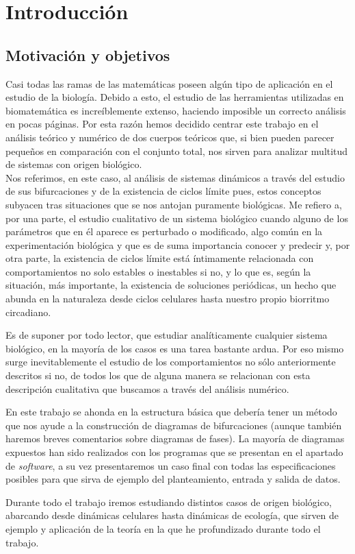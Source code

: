 \chapter{Introducción}

\section{ Motivación y objetivos}
Casi todas las ramas de las matemáticas poseen algún tipo de aplicación en el estudio de la biología. Debido a esto, el estudio de las herramientas utilizadas en biomatemática es increíblemente extenso, haciendo imposible un correcto análisis en pocas páginas. Por esta razón hemos decidido centrar este trabajo en el análisis teórico y numérico de dos cuerpos teóricos que, si bien pueden parecer pequeños en comparación con el conjunto total, nos sirven para analizar multitud de sistemas con origen biológico.\\ 

Nos referimos, en este caso, al análisis de sistemas dinámicos a través del estudio de sus bifurcaciones y de la existencia de ciclos límite pues, estos conceptos subyacen tras situaciones que se nos antojan puramente biológicas. Me refiero a, por una parte, el estudio cualitativo de un sistema  biológico cuando alguno de los parámetros que en él aparece es perturbado o modificado, algo común en la experimentación biológica y que es de suma importancia conocer y predecir y, por otra parte, la existencia de ciclos límite está íntimamente relacionada con comportamientos no solo estables o inestables si no, y lo que es, según la situación, más importante, la existencia de soluciones periódicas, un hecho que abunda en la naturaleza desde ciclos celulares hasta nuestro propio biorritmo circadiano.


Es de suponer por todo lector, que estudiar analíticamente cualquier sistema biológico, en la mayoría de los casos es una tarea bastante ardua. Por eso mismo surge inevitablemente el estudio de los comportamientos no sólo anteriormente descritos si no, de todos los que de alguna manera se relacionan con esta descripción cualitativa que buscamos a través del análisis numérico.

 En este trabajo se ahonda en la estructura básica que debería tener un método que nos ayude a la construcción de diagramas de bifurcaciones (aunque también haremos breves comentarios sobre diagramas de fases). La mayoría de diagramas expuestos han sido realizados con los programas que se presentan en el apartado de \textit{software}, a su vez presentaremos un caso final con todas las especificaciones posibles para que sirva de ejemplo del planteamiento, entrada y salida de datos.
 
 
Durante todo el trabajo iremos estudiando distintos casos de origen biológico, abarcando desde dinámicas celulares hasta dinámicas de ecología, que sirven de ejemplo y aplicación de la teoría en la que he profundizado durante todo el trabajo.
